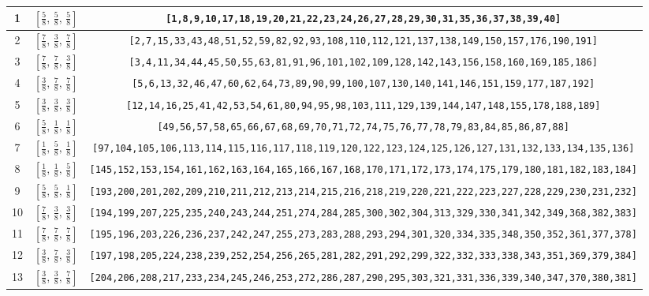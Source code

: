 \documentclass[fleqn,8pt]{jsarticle}
\begin{document}
\begin{longtable}{ccc}
1 & $\left[ \frac{5}{8},\, \frac{5}{8},\, \frac{5}{8} \right]$ & {\tt [1,8,9,10,17,18,19,20,21,22,23,24,26,27,28,29,30,31,35,36,37,38,39,40]} \\ \hline
2 & $\left[ \frac{7}{8},\, \frac{3}{8},\, \frac{7}{8} \right]$ & {\tt [2,7,15,33,43,48,51,52,59,82,92,93,108,110,112,121,137,138,149,150,157,176,190,191]} \\ \hline
3 & $\left[ \frac{7}{8},\, \frac{7}{8},\, \frac{3}{8} \right]$ & {\tt [3,4,11,34,44,45,50,55,63,81,91,96,101,102,109,128,142,143,156,158,160,169,185,186]} \\ \hline
4 & $\left[ \frac{3}{8},\, \frac{7}{8},\, \frac{7}{8} \right]$ & {\tt [5,6,13,32,46,47,60,62,64,73,89,90,99,100,107,130,140,141,146,151,159,177,187,192]} \\ \hline
5 & $\left[ \frac{3}{8},\, \frac{3}{8},\, \frac{3}{8} \right]$ & {\tt [12,14,16,25,41,42,53,54,61,80,94,95,98,103,111,129,139,144,147,148,155,178,188,189]} \\ \hline
6 & $\left[ \frac{5}{8},\, \frac{1}{8},\, \frac{1}{8} \right]$ & {\tt [49,56,57,58,65,66,67,68,69,70,71,72,74,75,76,77,78,79,83,84,85,86,87,88]} \\ \hline
7 & $\left[ \frac{1}{8},\, \frac{5}{8},\, \frac{1}{8} \right]$ & {\tt [97,104,105,106,113,114,115,116,117,118,119,120,122,123,124,125,126,127,131,132,133,134,135,136]} \\ \hline
8 & $\left[ \frac{1}{8},\, \frac{1}{8},\, \frac{5}{8} \right]$ & {\tt [145,152,153,154,161,162,163,164,165,166,167,168,170,171,172,173,174,175,179,180,181,182,183,184]} \\ \hline
9 & $\left[ \frac{5}{8},\, \frac{5}{8},\, \frac{1}{8} \right]$ & {\tt [193,200,201,202,209,210,211,212,213,214,215,216,218,219,220,221,222,223,227,228,229,230,231,232]} \\ \hline
10 & $\left[ \frac{7}{8},\, \frac{3}{8},\, \frac{3}{8} \right]$ & {\tt [194,199,207,225,235,240,243,244,251,274,284,285,300,302,304,313,329,330,341,342,349,368,382,383]} \\ \hline
11 & $\left[ \frac{7}{8},\, \frac{7}{8},\, \frac{7}{8} \right]$ & {\tt [195,196,203,226,236,237,242,247,255,273,283,288,293,294,301,320,334,335,348,350,352,361,377,378]} \\ \hline
12 & $\left[ \frac{3}{8},\, \frac{7}{8},\, \frac{3}{8} \right]$ & {\tt [197,198,205,224,238,239,252,254,256,265,281,282,291,292,299,322,332,333,338,343,351,369,379,384]} \\ \hline
13 & $\left[ \frac{3}{8},\, \frac{3}{8},\, \frac{7}{8} \right]$ & {\tt [204,206,208,217,233,234,245,246,253,272,286,287,290,295,303,321,331,336,339,340,347,370,380,381]} \\ \hline

\end{longtable}
\end{document}

